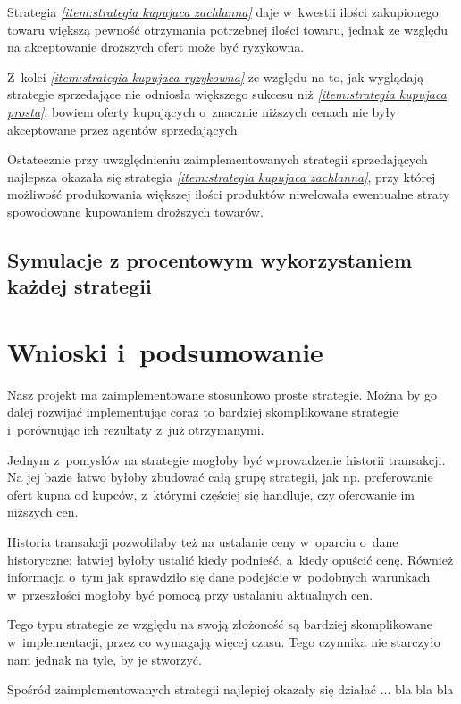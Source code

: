 \documentclass[12pt]{article}
\begin{document}
Strategia \emph{\ref{item:strategia kupujaca zachlanna}} daje w~kwestii ilości zakupionego towaru większą pewność otrzymania potrzebnej ilości towaru, jednak ze względu na akceptowanie droższych ofert może być ryzykowna.

Z~kolei \emph{\ref{item:strategia kupujaca ryzykowna}} ze względu na to, jak wyglądają strategie sprzedające nie odniosła większego sukcesu niż \emph{\ref{item:strategia kupujaca prosta}}, bowiem oferty kupujących
o~znacznie niższych cenach nie były akceptowane przez agentów sprzedających.

Ostatecznie przy uwzględnieniu zaimplementowanych strategii sprzedających najlepsza okazała się strategia \emph{\ref{item:strategia kupujaca zachlanna}}, przy której możliwość produkowania większej ilości produktów
niwelowała ewentualne straty spowodowane kupowaniem droższych towarów.





\subsection{Symulacje z procentowym wykorzystaniem każdej strategii}

\section{Wnioski i~podsumowanie}
Nasz projekt ma zaimplementowane stosunkowo proste strategie. Można by go dalej rozwijać implementując coraz to bardziej skomplikowane strategie i~porównując ich rezultaty z~już otrzymanymi.

Jednym z~pomysłów na strategie mogłoby być wprowadzenie historii transakcji. Na jej bazie łatwo byłoby zbudować całą grupę strategii, jak np. preferowanie ofert kupna od kupców, z~którymi częściej się handluje, czy
oferowanie im niższych cen.

Historia transakcji pozwoliłaby też na ustalanie ceny w~oparciu o~dane historyczne: łatwiej byłoby ustalić kiedy podnieść, a~kiedy opuścić cenę. Również informacja o~tym jak sprawdziło się dane podejście w~podobnych
warunkach w~przeszłości mogłoby być pomocą przy ustalaniu aktualnych cen.

Tego typu strategie ze względu na swoją złożoność są bardziej skomplikowane w~implementacji, przez co wymagają więcej czasu. Tego czynnika nie starczyło nam jednak na tyle, by je stworzyć.

Spośród zaimplementowanych strategii najlepiej okazały się działać ... bla bla bla
\end{document}
